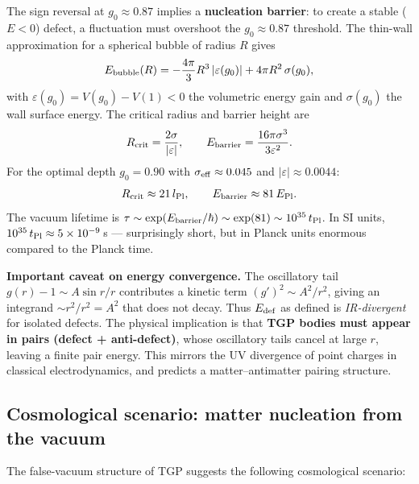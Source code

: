 The sign reversal at $g_0\approx0.87$ implies a \textbf{nucleation
barrier}: to create a stable ($E<0$) defect, a fluctuation must
overshoot the $g_0\approx0.87$ threshold.  The thin-wall approximation
for a spherical bubble of radius $R$ gives
\begin{equation}
  E_{\rm bubble}(R) = -\frac{4\pi}{3}R^3\,|\varepsilon(g_0)|
                    + 4\pi R^2\,\sigma(g_0),
\end{equation}
with $\varepsilon(g_0)=V(g_0)-V(1)<0$ the volumetric energy gain and
$\sigma(g_0)$ the wall surface energy.  The critical radius and
barrier height are
\begin{equation}
  R_{\rm crit} = \frac{2\sigma}{|\varepsilon|},
  \qquad
  E_{\rm barrier} = \frac{16\pi\sigma^3}{3\varepsilon^2}.
\end{equation}
For the optimal depth $g_0=0.90$ with $\sigma_{\rm eff}\approx0.045$
and $|\varepsilon|\approx0.0044$:
\begin{equation}
  R_{\rm crit} \approx 21\,l_{\rm Pl},
  \qquad
  E_{\rm barrier} \approx 81\,E_{\rm Pl}.
\end{equation}
The vacuum lifetime is $\tau\sim\exp(E_{\rm barrier}/\hbar)\sim
\exp(81)\sim10^{35}\,t_{\rm Pl}$.  In SI units, $10^{35}\,t_{\rm Pl}
\approx 5\times10^{-9}$\,s — surprisingly short, but in Planck units
enormous compared to the Planck time.

\textbf{Important caveat on energy convergence.}  The oscillatory
tail $g(r)-1\sim A\sin r/r$ contributes a kinetic term
$(g')^2\sim A^2/r^2$, giving an integrand $\sim r^2/r^2=A^2$ that
does not decay.  Thus $E_{\rm def}$ as defined is \emph{IR-divergent}
for isolated defects.  The physical implication is that \textbf{TGP
bodies must appear in pairs (defect + anti-defect)}, whose
oscillatory tails cancel at large $r$, leaving a finite pair energy.
This mirrors the UV divergence of point charges in classical
electrodynamics, and predicts a matter–antimatter pairing structure.

\subsection{Cosmological scenario: matter nucleation from the vacuum}

The false-vacuum structure of TGP suggests the following cosmological
scenario:

